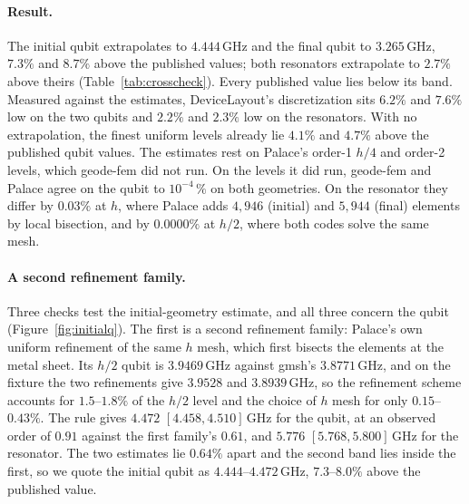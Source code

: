 \documentclass{anvil-paper}
\begin{document}
\paragraph{Result.}
The initial qubit extrapolates to $4.444$\,GHz and the final qubit to
$3.265$\,GHz, $7.3\%$ and $8.7\%$ above the published values; both
resonators extrapolate to $2.7\%$ above theirs
(Table~\ref{tab:crosscheck}). Every published value lies below its band.
Measured against the estimates, DeviceLayout's discretization sits $6.2\%$
and $7.6\%$ low on the two qubits and $2.2\%$ and $2.3\%$ low on the
resonators. With no extrapolation, the finest uniform levels already
lie $4.1\%$ and $4.7\%$ above the published qubit values. The estimates rest
on Palace's order-1 $h/4$ and order-2 levels, which geode-fem did not run.
On the levels it did run, geode-fem and Palace agree on the qubit to
$10^{-4}\,\%$ on both geometries. On the resonator they differ by $0.03\%$
at $h$, where Palace adds $4{,}946$ (initial) and $5{,}944$ (final)
elements by local bisection, and by $0.0000\%$ at $h/2$, where both codes
solve the same mesh.

\paragraph{A second refinement family.}
Three checks test the initial-geometry estimate, and all three concern the
qubit (Figure~\ref{fig:initialq}). The first is a second refinement family:
Palace's own uniform refinement of the same $h$ mesh, which first bisects
the elements at the metal sheet. Its $h/2$ qubit is $3.9469$\,GHz against
gmsh's $3.8771$\,GHz, and on the fixture the two refinements give $3.9528$
and $3.8939$\,GHz, so the refinement scheme accounts for $1.5$--$1.8\%$ of
the $h/2$ level and the choice of $h$ mesh for only $0.15$--$0.43\%$. The
rule gives $4.472$ $[4.458, 4.510]$\,GHz for the qubit, at an observed order
of $0.91$ against the first family's $0.61$, and $5.776$ $[5.768,
5.800]$\,GHz for the resonator. The two estimates lie $0.64\%$ apart and the
second band lies inside the first, so we quote the initial qubit as
$4.444$--$4.472$\,GHz, $7.3$--$8.0\%$ above the published value.
\end{document}
